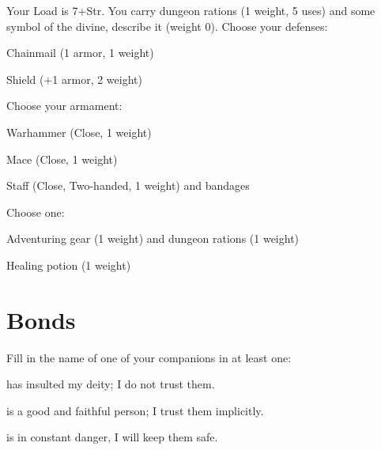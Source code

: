          

Your Load is 7+Str. You carry dungeon rations (1 weight, 5 uses) and some symbol of the divine, describe it (weight 0). Choose your defenses:

         
\startitemize[1,packed]
           
\item Chainmail (1 armor, 1 weight)

           
\item Shield (+1 armor, 2 weight)

         
\stopitemize
         

Choose your armament:

         
\startitemize[1,packed]
           
\item Warhammer (Close, 1 weight)

           
\item Mace (Close, 1 weight)

           
\item Staff (Close, Two-handed, 1 weight) and bandages

         
\stopitemize
         

Choose one:

         
\startitemize[1,packed]
           
\item Adventuring gear (1 weight) and dungeon rations (1 weight)

           
\item Healing potion (1 weight)

         
\stopitemize
       

       
\section{Bonds}   
       

         

Fill in the name of one of your companions in at least one:

         

\thinrules[n=2] has insulted my deity; I do not trust them.

         

\thinrules[n=2] is a good and faithful person; I trust them implicitly.

         

\thinrules[n=2] is in constant danger, I will keep them safe.

